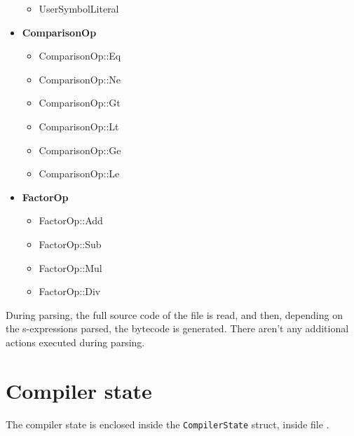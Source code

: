 \documentclass[11pt]{scrreprt}
\begin{document}
\begin{itemize}
\begin{itemize}
    \item UserSymbolLiteral
  \end{itemize}
  \item \textbf{ComparisonOp}
  \begin{itemize}
    \item ComparisonOp::Eq
    \item ComparisonOp::Ne
    \item ComparisonOp::Gt
    \item ComparisonOp::Lt
    \item ComparisonOp::Ge
    \item ComparisonOp::Le
  \end{itemize}
  \item \textbf{FactorOp}
  \begin{itemize}
    \item FactorOp::Add
    \item FactorOp::Sub
    \item FactorOp::Mul
    \item FactorOp::Div
  \end{itemize}
\end{itemize}

During parsing, the full source code of the file is read, and then, depending on the s-expressions parsed, the bytecode is generated. There aren't any additional actions executed during parsing.

\section{Compiler state}
The compiler state is enclosed inside the \texttt{CompilerState} struct, inside file .
\end{document}
